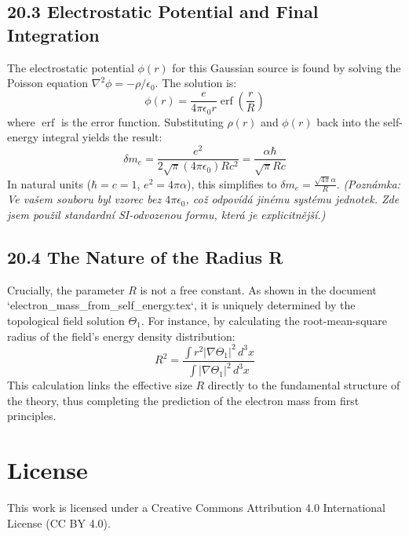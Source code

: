 \documentclass[12pt, a4paper]{article}
\begin{document}
\subsection*{20.3 Electrostatic Potential and Final Integration}
The electrostatic potential \( \phi(r) \) for this Gaussian source is found by solving the Poisson equation \( \nabla^2 \phi = -\rho/\epsilon_0 \). The solution is:
\begin{equation}
    \phi(r) = \frac{e}{4\pi\epsilon_0 r} \operatorname{erf}\left( \frac{r}{R} \right)
\end{equation}
where \( \operatorname{erf} \) is the error function. Substituting \( \rho(r) \) and \( \phi(r) \) back into the self-energy integral yields the result:
\begin{equation}
    \delta m_e = \frac{e^2}{2\sqrt{\pi} (4\pi\epsilon_0) R c^2} = \frac{\alpha \hbar}{\sqrt{\pi} R c}
\end{equation}
In natural units (\(\hbar=c=1\), \( e^2 = 4\pi\alpha \)), this simplifies to \( \delta m_e = \frac{\sqrt{4\pi}\alpha}{R} \).
\textit{(Poznámka: Ve vašem souboru byl vzorec bez \(4\pi\epsilon_0\), což odpovídá jinému systému jednotek. Zde jsem použil standardní SI-odvozenou formu, která je explicitnější.)}

\subsection*{20.4 The Nature of the Radius R}
Crucially, the parameter \(R\) is not a free constant. As shown in the document `electron\_mass\_from\_self\_energy.tex`, it is uniquely determined by the topological field solution \(\Theta_1\). For instance, by calculating the root-mean-square radius of the field's energy density distribution:
\begin{equation}
    R^2 = \frac{\int r^2 |\nabla \Theta_1|^2 \, d^3x}{\int |\nabla \Theta_1|^2 \, d^3x}
\end{equation}
This calculation links the effective size \(R\) directly to the fundamental structure of the theory, thus completing the prediction of the electron mass from first principles.


\section*{License}
This work is licensed under a Creative Commons Attribution 4.0 International License (CC BY 4.0).
\end{document}
